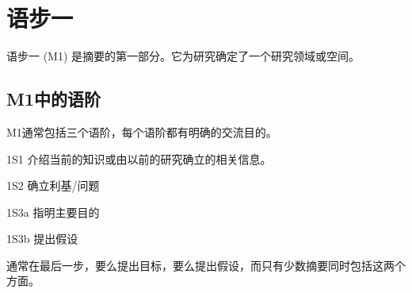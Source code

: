\documentclass[a4paper]{ctexbook}
\begin{document}
\chapter{语步一}\label{chapter3}

语步一 (M1) 是摘要的第一部分。它为研究确定了一个研究领域或空间。

\section{M1中的语阶}

M1通常包括三个语阶，每个语阶都有明确的交流目的。

1S1 介绍当前的知识或由以前的研究确立的相关信息。

1S2 确立利基/问题

1S3a 指明主要目的

1S3b 提出假设

通常在最后一步，要么提出目标，要么提出假设，而只有少数摘要同时包括这两个方面。
\end{document}

